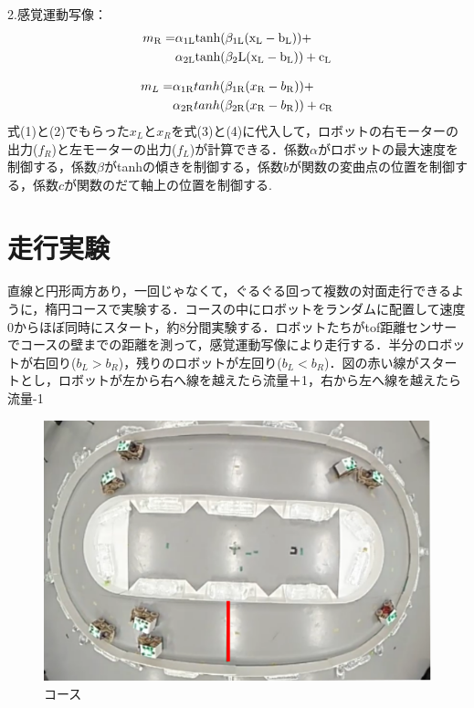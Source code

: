\documentclass[twocolumn]{jarticle} %
\begin{document}
2.感覚運動写像：
\begin{equation}
\begin{aligned}
  m_{\rm R} = &\alpha_{1{\rm L}} \rm tanh(\beta_{1{\rm L}}(x_{\rm L} - b_{\rm L})) + \\
        &\alpha_{2{\rm L}} \rm tanh(\beta_2{\rm L}(x_{\rm L} - b_{\rm L})) + c_L
\end{aligned}
\end{equation}

\begin{equation}
\begin{aligned}
  m_L = &\alpha_{1{\rm R}}tanh(\beta_{1{\rm R}}(x_{\rm R} - b_{\rm R})) + \\
        &\alpha_{2{\rm R}}tanh(\beta_{2{\rm R}}(x_{\rm R} - b_{\rm R})) + c_{\rm R}
\end{aligned}
\end{equation}
式(1)と(2)でもらった$x_L$と$x_R$を式(3)と(4)に代入して，ロボットの右モーターの出力($f_R$)と左モーターの出力($f_L$)が計算できる．係数$\alpha$がロボットの最大速度を制御する，係数$\beta$がtanhの傾きを制御する，係数$b$が関数の変曲点の位置を制御する，係数$c$が関数のだて軸上の位置を制御する. 



\section{走行実験}
直線と円形両方あり，一回じゃなくて，ぐるぐる回って複数の対面走行できるように，楕円コースで実験する．コースの中にロボットをランダムに配置して速度0からほぼ同時にスタート，約8分間実験する．ロボットたちがtof距離センサーでコースの壁までの距離を測って，感覚運動写像により走行する．半分のロボットが右回り($b_L>b_R$)，残りのロボットが左回り($b_L<b_R$)．図の赤い線がスタートとし，ロボットが左から右へ線を越えたら流量＋1，右から左へ線を越えたら流量-1

\begin{figure}[htb]
\centering
\includegraphics[width=0.5\linewidth]{course1.jpg}
\caption{
コース
}
\label{fig_dummy}
\end{figure}
\end{document}
